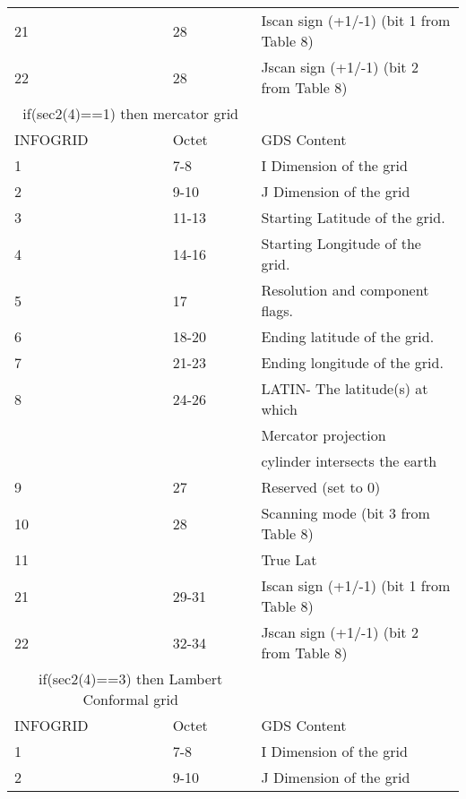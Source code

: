 \begin{longtable}{l|l|l}
    21 &    28  &  Iscan sign (+1/-1) (bit 1 from Table 8) \\                  
    22 &    28  &  Jscan sign (+1/-1) (bit 2 from Table 8) \\
\hline
\multicolumn{2}{c}{if(sec2(4)==1) then mercator grid }& \\
INFOGRID & Octet & GDS Content \\
\hline
      1 &             7-8   &  I Dimension of the grid   \\
      2 &            9-10   &  J Dimension of the grid    \\                               
      3 &          11-13   &  Starting Latitude of the grid.\\                            
      4 &          14-16   &  Starting Longitude of the grid.\\                          
      5 &        17   &  Resolution and component flags.   \\                        
      6 &          18-20   &  Ending latitude of the grid. \\                             
      7 &          21-23   &  Ending longitude of the grid. \\                            
      8 &          24-26   &  LATIN- The latitude(s) at which \\
        &                  & Mercator projection \\
        &                  & cylinder intersects the earth  \\                       
      9 &               27   &  Reserved (set to 0)       \\                    
     10 &               28   &  Scanning mode (bit 3 from Table 8) \\
     11 &                      &   True Lat \\ 
     21 &          29-31   &  Iscan sign (+1/-1) (bit 1 from Table 8) \\                  
     22 &          32-34   &  Jscan sign (+1/-1) (bit 2 from Table 8)   \\                
\hline
\multicolumn{2}{c}{if(sec2(4)==3) then Lambert Conformal grid} & \\
INFOGRID & Octet & GDS Content \\
\hline
      1 &          7-8  &  I Dimension of the grid   \\
      2 &        9-10  &  J Dimension of the grid    \\                               

\end{longtable}
